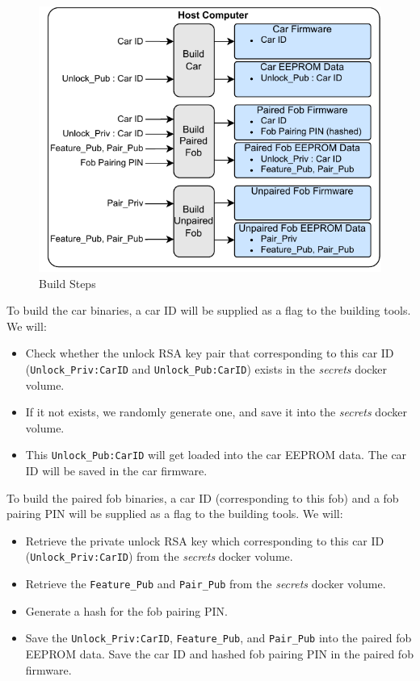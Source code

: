 \documentclass[11pt,oneside,onecolumn,letterpaper]{article}
\begin{document}
\begin{figure}[!htbp]
	\begin{centering}
		\includegraphics[width = .6\textwidth]{pic/build_step.pdf}
		\caption{Build Steps}
		\label{fig:build_step}
	\end{centering}
\end{figure}

To build the car binaries, a car ID will be supplied as a flag to the building tools. We will:
\begin{itemize}
	\item Check whether the unlock RSA key pair that corresponding to this car ID (\verb|Unlock_Priv:CarID| and \verb|Unlock_Pub:CarID|) exists in the \textit{secrets} docker volume.
	\item If it not exists, we randomly generate one, and save it into the \textit{secrets} docker volume.
	\item This \verb|Unlock_Pub:CarID| will get loaded into the car EEPROM data. The car ID will be saved in the car firmware.
\end{itemize}

To build the paired fob binaries, a car ID (corresponding to this fob) and a fob pairing PIN will be supplied as a flag to the building tools. We will:
\begin{itemize}
	\item Retrieve the private unlock RSA key which corresponding to this car ID (\verb|Unlock_Priv:CarID|) from the \textit{secrets} docker volume.
	\item Retrieve the \verb|Feature_Pub| and \verb|Pair_Pub| from the \textit{secrets} docker volume.
	\item Generate a hash for the fob pairing PIN.
	\item Save the \verb|Unlock_Priv:CarID|, \verb|Feature_Pub|, and \verb|Pair_Pub| into the paired fob EEPROM data. Save the car ID and hashed fob pairing PIN in the paired fob firmware.
\end{itemize}
\end{document}
